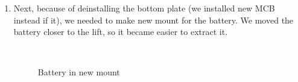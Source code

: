 \begin{enumerate}
\begin{enumerate}
		\item Next, because of deinstalling the bottom plate (we installed new MCB instead if it), we needed to make new mount for the battery. We moved the battery closer to the lift, so it became easier to extract it.
		\begin{figure}[H]
			\begin{minipage}[h]{0.2\linewidth}
				\center  
			\end{minipage}
			\begin{minipage}[h]{0.6\linewidth}
				\caption{Battery in new mount}
			\end{minipage}
		\end{figure}
		

\end{enumerate}
\end{enumerate}
